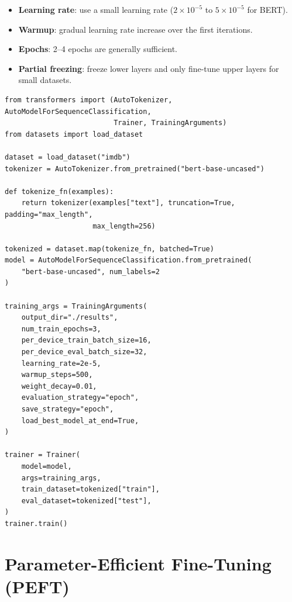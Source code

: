 \begin{bestpractice}[title=\textbf{Fine-tuning strategies}]
\begin{itemize}
    \item \textbf{Learning rate}: use a small learning rate ($2\times 10^{-5}$
          to $5\times 10^{-5}$ for BERT).
    \item \textbf{Warmup}: gradual learning rate increase over the first
          iterations.
    \item \textbf{Epochs}: 2--4 epochs are generally sufficient.
    \item \textbf{Partial freezing}: freeze lower layers and only fine-tune
          upper layers for small datasets.
\end{itemize}
\end{bestpractice}

\begin{codeblock}[title=\textbf{Fine-tuning BERT with Hugging Face Trainer}]
\begin{verbatim}
from transformers import (AutoTokenizer, AutoModelForSequenceClassification,
                          Trainer, TrainingArguments)
from datasets import load_dataset

dataset = load_dataset("imdb")
tokenizer = AutoTokenizer.from_pretrained("bert-base-uncased")

def tokenize_fn(examples):
    return tokenizer(examples["text"], truncation=True, padding="max_length",
                     max_length=256)

tokenized = dataset.map(tokenize_fn, batched=True)
model = AutoModelForSequenceClassification.from_pretrained(
    "bert-base-uncased", num_labels=2
)

training_args = TrainingArguments(
    output_dir="./results",
    num_train_epochs=3,
    per_device_train_batch_size=16,
    per_device_eval_batch_size=32,
    learning_rate=2e-5,
    warmup_steps=500,
    weight_decay=0.01,
    evaluation_strategy="epoch",
    save_strategy="epoch",
    load_best_model_at_end=True,
)

trainer = Trainer(
    model=model,
    args=training_args,
    train_dataset=tokenized["train"],
    eval_dataset=tokenized["test"],
)
trainer.train()
\end{verbatim}
\end{codeblock}

\section{Parameter-Efficient Fine-Tuning (PEFT)}
\label{sec:ft:peft}

